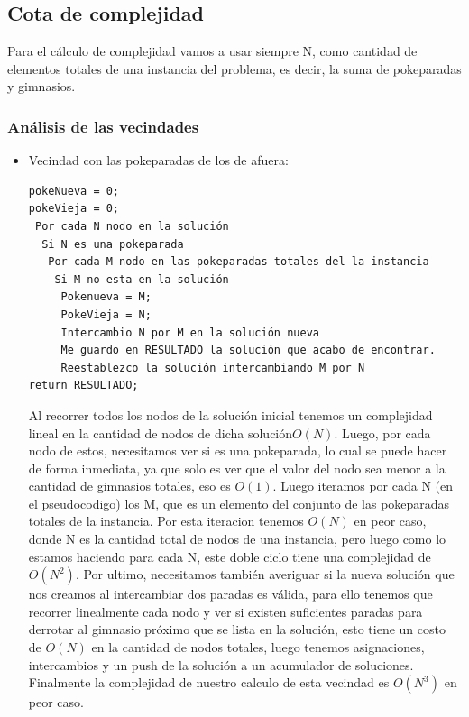 \subsection{Cota de complejidad}

Para el cálculo de complejidad vamos a usar siempre N, como cantidad de elementos totales de una instancia del problema, es decir, la suma de pokeparadas y gimnasios.

\subsubsection{Análisis de las vecindades}

\begin{itemize}

\item  Vecindad con las pokeparadas de los de afuera:

\begin{verbatim}
pokeNueva = 0;
pokeVieja = 0;
 Por cada N nodo en la solución
  Si N es una pokeparada 
   Por cada M nodo en las pokeparadas totales del la instancia
    Si M no esta en la solución
     Pokenueva = M;
     PokeVieja = N;
     Intercambio N por M en la solución nueva
     Me guardo en RESULTADO la solución que acabo de encontrar.
     Reestablezco la solución intercambiando M por N  
return RESULTADO;
\end{verbatim}

Al recorrer todos los nodos de la solución inicial tenemos un complejidad lineal en la cantidad de nodos de dicha solución$ O(N)$. Luego, por cada nodo de estos, necesitamos ver si es una pokeparada, lo cual se puede hacer de forma inmediata, ya que solo es ver que el valor del nodo sea menor a la cantidad de gimnasios totales, eso es $O(1)$. Luego iteramos por cada N (en el pseudocodigo) los M, que es un elemento del conjunto de las pokeparadas totales de la instancia. Por esta iteracion tenemos $O(N)$ en peor caso, donde N es la cantidad total de nodos de una instancia, pero luego como lo estamos haciendo para cada N, este doble ciclo tiene una complejidad de $O(N^2)$. Por ultimo, necesitamos también averiguar si la nueva solución que nos creamos al intercambiar dos paradas es válida, para ello tenemos que recorrer linealmente cada nodo y ver si existen suficientes paradas para derrotar al gimnasio próximo que se lista en la solución, esto tiene un costo de $O(N)$ en la cantidad de nodos totales, luego tenemos asignaciones, intercambios y un push de la solución a un acumulador de soluciones.
Finalmente la complejidad de nuestro calculo de esta vecindad es $O(N^3)$ en peor caso.


\end{itemize}
